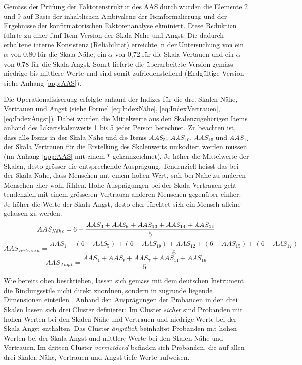 Gemäss der Prüfung der Faktorenstruktur des AAS durch  wurden die Elemente 2 und 9 auf Basis der inhaltlichen Ambivalenz der Itemformulierung und der Ergebnisse der konfirmatorischen Faktorenanalyse eliminiert. Diese Reduktion führte zu einer fünf-Item-Version der Skala Nähe und Angst. Die dadurch erhaltene interne Konsistenz (Reliabilität) erreichte in der Untersuchung von  ein $\alpha$ von 0,80 für die Skala Nähe, ein $\alpha$ von 0,72 für die Skala Vertauen und ein $\alpha$ von 0,78 für die Skala Angst. Somit lieferte die überarbeitete Version gemäss  niedrige bis mittlere Werte und sind somit zufriedenstellend (Endgültige Version siehe Anhang \ref{app:AAS}).

Die Operationalisiserung erfolgte anhand der Indizes für die drei Skalen Nähe, Vertrauen und Angst (siehe Formel \ref{eq:IndexNähe}, \ref{eq:IndexVertrauen}, \ref{eq:IndexAngst}). Dabei wurden die Mittelwerte aus den Skalenzugehörigen Items anhand des Likertskalenwerts 1 bis 5 jeder Person berechnet. Zu beachten ist, dass alle Items in der Skala Nähe und die Items $AAS_{5}$, $AAS_{10}$, $AAS_{15}$ und $AAS_{17}$ der Skala Vertrauen für die Erstellung des Skalenwerts umkodiert werden müssen (im Anhang \ref{app:AAS} mit einem * gekennzeichnet). Je höher die Mittelwerte der Skalen, desto grösser die entsprechende Ausprägung. Tendenziell heisst das bei der Skala Nähe, dass Menschen mit einem hohen Wert, sich bei Nähe zu anderen Menschen eher wohl fühlen. Hohe Ausprägungen bei der Skala Vertrauen geht tendenziell mit einem grösseren Vertrauen anderen Menschen gegenüber einher. Je höher die Werte der Skala Angst, desto eher fürchtet sich ein Mensch alleine gelassen zu werden.
\begin{equation}\label{eq:IndexNähe}
    AAS_{\text{\textit{N{\"a}he}}}=6-\frac{AAS_{3}+AAS_{8}+AAS_{13}+AAS_{14}+AAS_{18}}{5}
\end{equation}
\begin{equation}\label{eq:IndexVertrauen}
    AAS_{Vertrauen}=\frac{AAS_{1}+(6-AAS_{5})+(6-AAS_{10})+AAS_{12}+(6-AAS_{15})+(6-AAS_{17})}{6}
\end{equation}
\begin{equation}\label{eq:IndexAngst}
    AAS_{Angst}=\frac{AAS_{4}+AAS_{6}+AAS_{7}+AAS_{11}+AAS_{16}}{5}
\end{equation}

Wie bereits oben beschrieben, lassen sich gemäss  mit dem deutschen Instrument die Bindungsstile nicht direkt zuordnen, sondern in zugrunde liegende Dimensionen einteilen \cite{Schuetzmann2004}. Anhand den Ausprägungen der Probanden in den drei Skalen lassen sich drei Cluster definieren: Im Cluster \textit{sicher} sind Probanden mit hohen Werten bei den Skalen Nähe und Vertrauen und niedrige Werte bei der Skala Angst enthalten. Das Cluster \textit{ängstlich} beinhaltet Probanden mit hohen Werten bei der Skala Angst und mittlere Werte bei den Skalen Nähe und Vertrauen. Im dritten Cluster \textit{vermeidend} befinden sich Probanden, die auf allen drei Skalen Nähe, Vertrauen und Angst tiefe Werte aufweisen.


